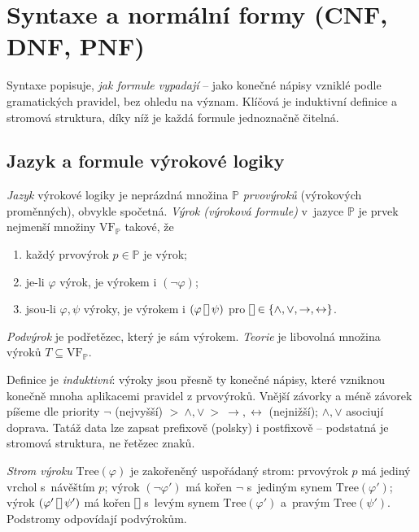 \documentclass[11pt,a4paper]{article}
\newcommand{\conn}{\mathbin{\vcenter{\hbox{\framebox[1.05ex][c]{\rule{0pt}{0.72ex}}}}}}
\begin{document}
\section{Syntaxe a normální formy (CNF, DNF, PNF)}

Syntaxe popisuje, \emph{jak formule vypadají} -- jako konečné nápisy vzniklé podle gramatických pravidel, bez ohledu na význam. Klíčová je induktivní definice a stromová struktura, díky níž je každá formule jednoznačně čitelná.

\subsection{Jazyk a formule výrokové logiky}

\begin{definice}
\emph{Jazyk} výrokové logiky je neprázdná množina $\mathbb{P}$ \emph{prvovýroků} (výrokových proměnných), obvykle spočetná. \emph{Výrok (výroková formule)} v~jazyce $\mathbb{P}$ je prvek nejmenší množiny $\mathrm{VF}_{\mathbb{P}}$ takové, že
\begin{enumerate}[label=(\arabic*)]
  \item každý prvovýrok $p\in\mathbb{P}$ je výrok;
  \item je-li $\varphi$ výrok, je výrokem i $(\neg\varphi)$;
  \item jsou-li $\varphi,\psi$ výroky, je výrokem i $(\varphi\conn\psi)$ pro $\conn\in\{\wedge,\vee,\to,\leftrightarrow\}$.
\end{enumerate}
\emph{Podvýrok} je podřetězec, který je sám výrokem. \emph{Teorie} je libovolná množina výroků $T\subseteq\mathrm{VF}_{\mathbb{P}}$.
\end{definice}

\begin{intuice}
Definice je \emph{induktivní}: výroky jsou přesně ty konečné nápisy, které vzniknou konečně mnoha aplikacemi pravidel z prvovýroků. Vnější závorky a méně závorek píšeme dle priority $\neg$ (nejvyšší) $>\ \wedge,\vee\ >\ \to,\leftrightarrow$ (nejnižší); $\wedge,\vee$ asociují doprava. Tatáž data lze zapsat prefixově (polsky) i postfixově -- podstatná je stromová struktura, ne řetězec znaků.
\end{intuice}

\begin{definice}
\emph{Strom výroku} $\mathrm{Tree}(\varphi)$ je zakořeněný uspořádaný strom: prvovýrok $p$ má jediný vrchol s~návěštím $p$; výrok $(\neg\varphi')$ má kořen $\neg$ s~jediným synem $\mathrm{Tree}(\varphi')$; výrok $(\varphi'\conn\psi')$ má kořen $\conn$ s~levým synem $\mathrm{Tree}(\varphi')$ a~pravým $\mathrm{Tree}(\psi')$. Podstromy odpovídají podvýrokům.
\end{definice}
\end{document}
